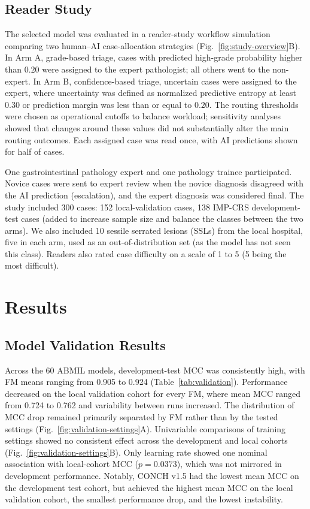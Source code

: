 \documentclass[runningheads]{llncs}
\begin{document}
\subsection{Reader Study}

The selected model was evaluated in a reader-study workflow simulation comparing two human--AI case-allocation 
strategies (Fig.~\ref{fig:study-overview}B). In Arm A, grade-based triage, cases with predicted high-grade probability higher than $0.20$ 
were assigned to the expert pathologist; all others went to the non-expert. In Arm B, confidence-based triage, 
uncertain cases were assigned to the expert, where uncertainty was defined as normalized predictive entropy at least $0.30$ or 
prediction margin was less than or equal to $0.20$. The routing thresholds were chosen as operational cutoffs to balance workload; 
sensitivity analyses showed that changes around these values did not substantially alter the main routing outcomes.
 Each assigned case was read once, with AI predictions shown for half of cases.

One gastrointestinal pathology expert and one pathology trainee participated. Novice cases were sent to expert review when the novice diagnosis 
disagreed with the AI prediction (escalation), and the expert diagnosis was considered final. The study included 300 cases: 
152 local-validation cases, 138 IMP-CRS development-test cases (added to increase sample size and balance the classes between the two arms). 
We also included 10 sessile serrated lesions (SSLs) from the local hospital, five in each arm, used as an out-of-distribution set (as the model has not seen this class). 
Readers also rated case difficulty on a scale of 1 to 5 (5 being the most difficult). 


\section{Results}

\subsection{Model Validation Results}

Across the 60 ABMIL models, development-test MCC was consistently high, with FM
means ranging from 0.905 to 0.924 (Table~\ref{tab:validation}). Performance
decreased on the local validation cohort for every FM, where mean MCC ranged
from 0.724 to 0.762 and variability between runs increased. The distribution
of MCC drop remained primarily separated by FM rather than by the tested 
settings (Fig.~\ref{fig:validation-settings}A).
Univariable comparisons of training settings showed no consistent effect across the development and
local cohorts (Fig.~\ref{fig:validation-settings}B). Only learning rate showed one
nominal association with local-cohort MCC ($p=0.0373$), which was not mirrored in development performance.  
Notably, CONCH v1.5 had the lowest mean MCC on the development test
cohort, but achieved the highest mean MCC on the local validation cohort, the
smallest performance drop, and the lowest instability.
\end{document}
